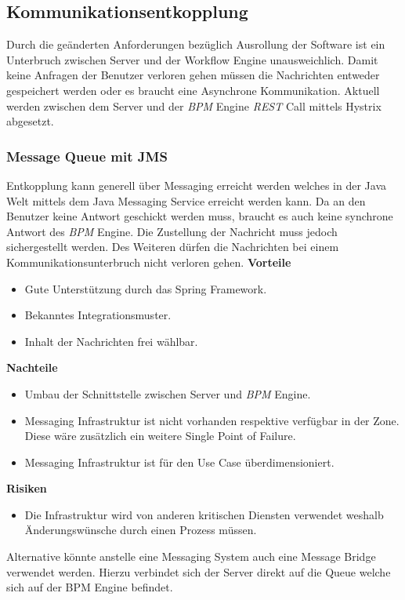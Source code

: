 \subsection{Kommunikationsentkopplung}

Durch die geänderten Anforderungen bezüglich Ausrollung der Software ist ein Unterbruch zwischen Server und der Workflow Engine unausweichlich. Damit keine Anfragen der Benutzer verloren gehen müssen die Nachrichten entweder gespeichert werden oder es braucht eine Asynchrone Kommunikation. Aktuell werden zwischen dem Server und der \textit{\gls{BPM}} Engine \textit{\gls{REST}} Call mittels Hystrix abgesetzt.

\subsubsection{Message Queue mit JMS}

Entkopplung kann generell über Messaging erreicht werden welches in der Java Welt mittels dem Java Messaging Service erreicht werden kann. Da an den Benutzer keine Antwort geschickt werden muss, braucht es auch keine synchrone Antwort des \textit{\gls{BPM}} Engine. Die Zustellung der Nachricht muss jedoch sichergestellt werden. Des Weiteren dürfen die Nachrichten bei einem Kommunikationsunterbruch nicht verloren gehen.
\newline
\newline
\textbf{Vorteile}
\begin{itemize}
	\item Gute Unterstützung durch das Spring Framework.
	\item Bekanntes Integrationsmuster.
	\item Inhalt der Nachrichten frei wählbar.
\end{itemize}
\textbf{Nachteile}
\begin{itemize}
	\item Umbau der Schnittstelle zwischen Server und \textit{\gls{BPM}} Engine.
	\item Messaging Infrastruktur ist nicht vorhanden respektive verfügbar in der Zone. Diese wäre zusätzlich ein weitere Single Point of Failure.
	\item Messaging Infrastruktur ist für den Use Case überdimensioniert.
\end{itemize}
\textbf{Risiken}
\begin{itemize}
	\item Die Infrastruktur wird von anderen kritischen Diensten verwendet weshalb Änderungswünsche durch einen Prozess müssen.
\end{itemize}
Alternative könnte anstelle eine Messaging System auch eine Message Bridge verwendet werden. Hierzu verbindet sich der Server direkt auf die Queue welche sich auf der BPM Engine befindet.

